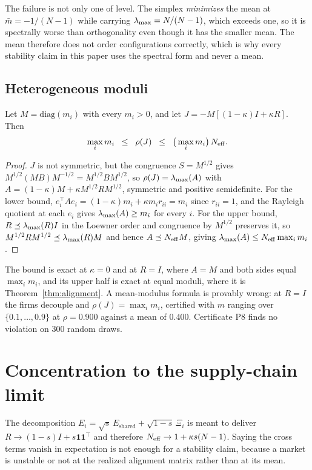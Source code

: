 The failure is not only one of level. The simplex \emph{minimizes} the mean at $\bar{m} = -1/(N-1)$ while carrying $\lambda_{\max} = N/(N-1)$, which exceeds one, so it is spectrally worse than orthogonality even though it has the smaller mean. The mean therefore does not order configurations correctly, which is why every stability claim in this paper uses the spectral form and never a mean.

\subsection{Heterogeneous moduli}

\begin{aproposition}
\label{prop:hetmod}
Let $M=\mathrm{diag}(m_i)$ with every $m_i>0$, and let $J = -M[(1-\kappa)I+\kappa R]$. Then
\[
  \max_i m_i \;\;\leq\;\; \rho(J) \;\;\leq\;\; \big(\max_i m_i\big)\,N_{\mathrm{eff}} .
\]
\end{aproposition}

\begin{proof}
$J$ is not symmetric, but the congruence $S = M^{1/2}$ gives $M^{1/2}(MB)M^{-1/2} = M^{1/2}BM^{1/2}$, so $\rho(J) = \lambda_{\max}(A)$ with $A = (1-\kappa)M + \kappa M^{1/2}RM^{1/2}$, symmetric and positive semidefinite. For the lower bound, $e_i^{\top}Ae_i = (1-\kappa)m_i + \kappa m_i r_{ii} = m_i$ since $r_{ii}=1$, and the Rayleigh quotient at each $e_i$ gives $\lambda_{\max}(A) \geq m_i$ for every $i$. For the upper bound, $R \preceq \lambda_{\max}(R) I$ in the Loewner order and congruence by $M^{1/2}$ preserves it, so $M^{1/2}RM^{1/2} \preceq \lambda_{\max}(R)M$ and hence $A \preceq N_{\mathrm{eff}} M$, giving $\lambda_{\max}(A) \leq N_{\mathrm{eff}} \max_i m_i$.
\end{proof}

The bound is exact at $\kappa=0$ and at $R=I$, where $A=M$ and both sides equal $\max_i m_i$, and its upper half is exact at equal moduli, where it is Theorem~\ref{thm:alignment}. A mean-modulus formula is provably wrong: at $R=I$ the firms decouple and $\rho(J) = \max_i m_i$, certified with $m$ ranging over $\{0.1,\ldots,0.9\}$ at $\rho = 0.900$ against a mean of $0.400$. Certificate P8 finds no violation on 300 random draws.

\section{Concentration to the supply-chain limit}
\label{app:concentration}

The decomposition $E_i = \sqrt{s}\,E_{\text{shared}} + \sqrt{1-s}\,\Xi_i$ is meant to deliver $R \to (1-s)I + s\mathbf{1}\mathbf{1}^{\top}$ and therefore $N_{\mathrm{eff}} \to 1 + \kappa s(N-1)$. Saying the cross terms vanish in expectation is not enough for a stability claim, because a market is unstable or not at the realized alignment matrix rather than at its mean.


